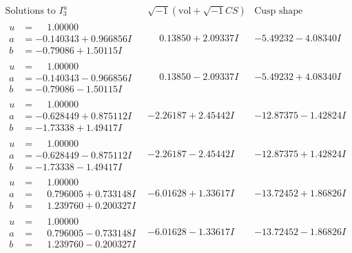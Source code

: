 \documentclass[1p]{elsarticle_modified}
\theoremstyle{definition}
\newcommand{\I}{\sqrt{-1}}
\begin{document}
$$\begin{array}{c|c|c}  
\text{Solutions to }I^u_{3}& \I (\text{vol} + \sqrt{-1}CS) & \text{Cusp shape}\\
 \hline 
\begin{aligned}
u &= \phantom{-}1.00000\phantom{ +0.000000I} \\
a &= -0.140343 + 0.966856 I \\
b &= -0.79086 + 1.50115 I\end{aligned}
 & \phantom{-}0.13850 + 2.09337 I & -5.49232 - 4.08340 I \\ \hline\begin{aligned}
u &= \phantom{-}1.00000\phantom{ +0.000000I} \\
a &= -0.140343 - 0.966856 I \\
b &= -0.79086 - 1.50115 I\end{aligned}
 & \phantom{-}0.13850 - 2.09337 I & -5.49232 + 4.08340 I \\ \hline\begin{aligned}
u &= \phantom{-}1.00000\phantom{ +0.000000I} \\
a &= -0.628449 + 0.875112 I \\
b &= -1.73338 + 1.49417 I\end{aligned}
 & -2.26187 + 2.45442 I & -12.87375 - 1.42824 I \\ \hline\begin{aligned}
u &= \phantom{-}1.00000\phantom{ +0.000000I} \\
a &= -0.628449 - 0.875112 I \\
b &= -1.73338 - 1.49417 I\end{aligned}
 & -2.26187 - 2.45442 I & -12.87375 + 1.42824 I \\ \hline\begin{aligned}
u &= \phantom{-}1.00000\phantom{ +0.000000I} \\
a &= \phantom{-}0.796005 + 0.733148 I \\
b &= \phantom{-}1.239760 + 0.200327 I\end{aligned}
 & -6.01628 + 1.33617 I & -13.72452 + 1.86826 I \\ \hline\begin{aligned}
u &= \phantom{-}1.00000\phantom{ +0.000000I} \\
a &= \phantom{-}0.796005 - 0.733148 I \\
b &= \phantom{-}1.239760 - 0.200327 I\end{aligned}
 & -6.01628 - 1.33617 I & -13.72452 - 1.86826 I \\ \hline\begin{aligned}

\end{aligned}
\end{array}$$
\end{document}

